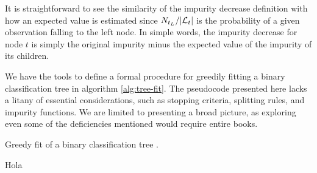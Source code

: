 It is straightforward to see the similarity of the impurity decrease definition
with how an expected value is estimated since $N_{t_L} / |\mathcal{L}_t|$ is the
probability of a given observation falling to the left node. In simple words,
the impurity decrease for node $t$ is simply the original impurity minus the
expected value of the impurity of its children.

We have the tools to define a formal procedure for greedily fitting a binary
classification tree in algorithm \ref{alg:tree-fit}. The pseudocode presented
here lacks a litany of essential considerations, such as stopping criteria,
splitting rules, and impurity functions. We are limited to presenting a broad
picture, as exploring even some of the deficiencies mentioned would require
entire books.

\begin{algorithm}
    \caption[Greedy tree fitting algorithm]{Greedy fit of a binary
        classification tree \cite[Ch.~3.3]{louppe2014}.}
    \label{alg:tree-fit}
\end{algorithm}

Hola

